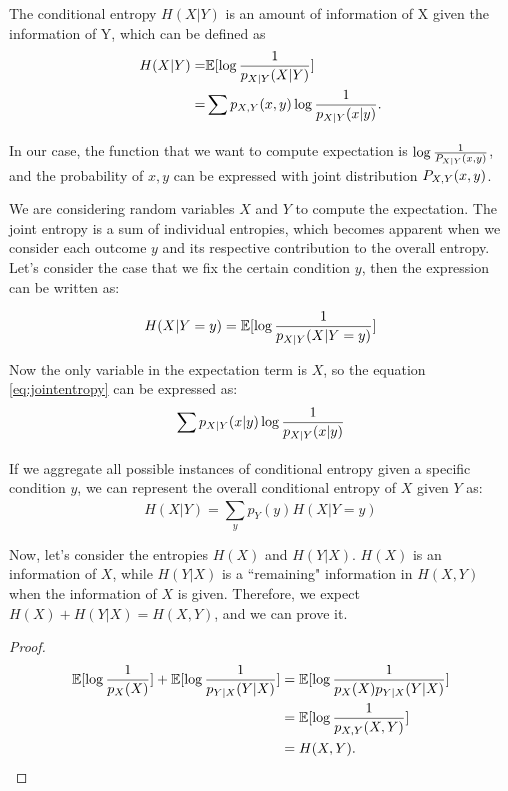 \documentclass{article}
\newcommand{\mn}[1]{\mathnormal{#1}}
\begin{document}
\begin{definition}
The conditional entropy $H(X|Y)$ is an amount of information of X given the information of Y, which can be defined as 
\begin{align}
    H(X|Y) =& \mathbb{E}[\log\frac{1}{p_\mn{X|Y}(X|Y)}]\\
    =&\sum_{}^{}p_\mn{X,Y}(x,y)\log\frac{1}{p_\mn{X|Y}(x|y)}.
\end{align}

\end{definition}
In our case, the function that we want to compute expectation is $\log\frac{1}{P_\mn{X|Y}(x,y)}$, and the probability of $x,y$ can be expressed with joint distribution $P_\mn{X,Y}(x,y)$.

We are considering random variables $X$ and $Y$ to compute the expectation.
The joint entropy is a sum of individual entropies, which becomes apparent when we consider each outcome $y$ and its respective contribution to the overall entropy.
Let's consider the case that we fix the certain condition $y$, then the expression can be written as:

\begin{equation}\label{eq:jointentropy}
H(X|Y=y)=\mathbb{E}[\log\frac{1}{p_\mn{X|Y}(X|Y=y)}]
\end{equation}

Now the only variable in the expectation term is $X$, so the equation \eqref{eq:jointentropy} can be expressed as:
\begin{equation}
\sum_{}^{}p_\mn{X|Y}(x|y)\log\frac{1}{p_\mn{X|Y}(x|y)}
\end{equation}

If we aggregate all possible instances of conditional entropy given a specific condition $y$, we can represent the overall conditional entropy of $X$ given $Y$ as:
\begin{equation}
H(X|Y)=\sum_y^{}p_Y(y)H(X|Y=y)
\end{equation}

Now, let's consider the entropies $H(X)$ and $H(Y|X)$.
$H(X)$ is an information of $X$, while $H(Y|X)$ is a ``remaining" information in $H(X,Y)$ when the information of $X$ is given.
Therefore, we expect $H(X)+H(Y|X)=H(X,Y)$, and we can prove it.

\begin{proof}
\begin{align}
     \mathbb{E}[\log\frac{1}{p_X(X)}]+ \mathbb{E}[\log\frac{1}{p_\mn{Y|X}(Y|X)}]
    & =\mathbb{E}[\log\frac{1}{p_X(X)p_\mn{Y|X}(Y|X)}]\\
    & =\mathbb{E}[\log\frac{1}{p_\mn{X,Y}(X,Y)}]\\
    & =H(X,Y).
\end{align}
\end{proof}
\end{document}
